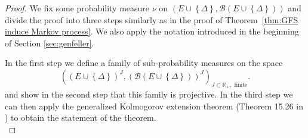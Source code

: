 \documentclass[a4paper,12pt]{article}
\theoremstyle{definition}
\theoremstyle{remark}
\numberwithin{equation}{section}
\numberwithin{theorem}{section}
\begin{document}
\begin{proof}
We fix some probability measure $\nu$ on $\left(E\cup\left\{ \Delta\right\} ,\mathcal{B}(E\cup\left\{ \Delta\right\} )\right)$ and divide the proof into three steps similarly as in the proof of  Theorem~\ref{thm:GFS induce Markov process}. We also apply the  notation introduced in the beginning of Section \ref{sec:genfeller}.

In the first step we define a family of sub-probability measures on the space
\[
\left(\left(E\cup\left\{ \Delta\right\} \right)^{J},\left(\mathcal{B}\left(E\cup\left\{ \Delta\right\} \right)\right)^{J}\right)_{J\subset\mathbb{R}_{+},\text{ finite}}.
\]
and show in the second step that this family is projective.  In the third step
we can then apply the generalized Kolmogorov extension theorem (Theorem 15.26 in \cite{AlB}) to obtain the
statement of the theorem. \\


\end{proof}
\end{document}
